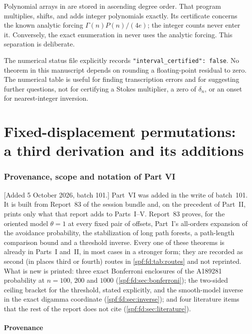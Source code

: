 \documentclass[11pt]{article}
\numberwithin{equation}{section}
\theoremstyle{definition}
\theoremstyle{remark}
\theoremstyle{definition}
\begin{document}
Polynomial arrays in  are stored in
ascending degree order. That program multiplies, shifts, and adds integer
polynomials exactly. Its certificate concerns the known analytic forcing
$\Gamma(n)P(n)/(4e)$; the integer counts never enter it. Conversely, the
exact enumeration in  never uses the analytic forcing.
This separation is deliberate.

The numerical status file explicitly records
\texttt{"interval\_certified": false}. No theorem in this manuscript depends
on rounding a floating-point residual to zero. The numerical table is useful
for finding transcription errors and for suggesting further questions, not
for certifying a Stokes multiplier, a zero of $\delta_n$, or an onset for
nearest-integer inversion.

\part{Fixed-displacement permutations: a third derivation and its additions}
\label{spf:fd:part}

\section{Provenance, scope and notation of Part VI}
\label{spf:fd:sec:front}

[Added 5 October 2026, batch 101.] Part~VI was added in the write of
batch~101. It is built from Report~83 of the session bundle and, on the
precedent of Part~II, prints only what that report adds to Parts~I--V.
Report~83 proves, for the oriented model $\theta=1$ at every fixed pair of
offsets, Part~I's all-orders expansion of the avoidance probability, the
stabilization of long path forests, a path-length comparison bound and a
threshold inverse. Every one of these theorems is already in Parts~I
and~II, in most cases in a stronger form; they are recorded as second (in
places third or fourth) routes in \cref{spf:fd:tab:routes} and not
reprinted. What is new is printed: three exact Bonferroni enclosures of
the A189281 probability at $n=100$, $200$ and $1000$
(\cref{spf:fd:sec:bonferroni}); the two-sided ceiling bracket for the
threshold, stated explicitly, and the smooth-model inverse in the exact
digamma coordinate (\cref{spf:fd:sec:inverse}); and four literature items
that the rest of the report does not cite (\cref{spf:fd:sec:literature}).

\subsection{Provenance}
\label{spf:fd:sec:provenance}
\end{document}
